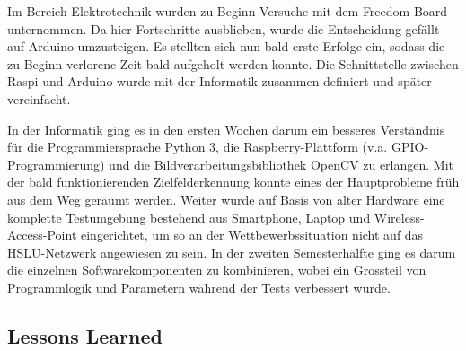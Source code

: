 Im Bereich Elektrotechnik wurden zu Beginn Versuche mit dem Freedom Board unternommen. Da hier Fortschritte ausblieben, wurde die Entscheidung gefällt auf Arduino umzusteigen. Es stellten sich nun bald erste Erfolge ein, sodass die zu Beginn verlorene Zeit bald aufgeholt werden konnte. Die Schnittstelle zwischen Raspi und Arduino wurde mit der Informatik zusammen definiert und später vereinfacht.

In der Informatik ging es in den ersten Wochen darum ein besseres Verständnis für die Programmiersprache Python 3, die Raspberry-Plattform (v.a. GPIO-Programmierung) und die Bildverarbeitungsbibliothek OpenCV zu erlangen. Mit der bald funktionierenden Zielfelderkennung konnte eines der Hauptprobleme früh aus dem Weg geräumt werden. Weiter wurde auf Basis von alter Hardware eine komplette Testumgebung bestehend aus Smartphone, Laptop und Wireless-Access-Point eingerichtet, um so an der Wettbewerbssituation nicht auf das HSLU-Netzwerk angewiesen zu sein. In der zweiten Semesterhälfte ging es darum die einzelnen Softwarekomponenten zu kombinieren, wobei ein Grossteil von Programmlogik und Parametern während der Tests verbessert wurde.

\subsection{Lessons Learned}

